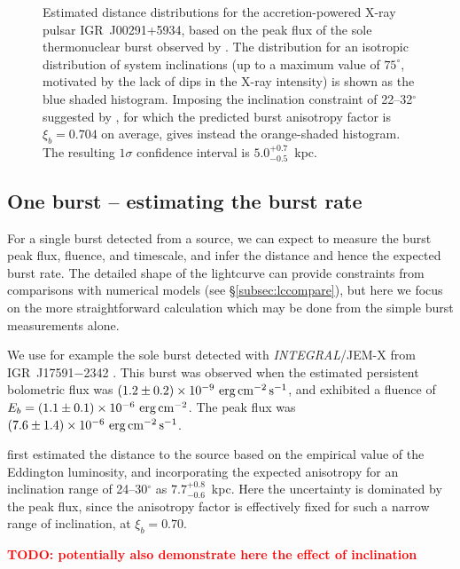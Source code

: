 \documentclass{aastex63}
\newcommand{\epcs}{{\rm erg\,cm^{-2}\,s^{-1}}}
\newcommand{\igr}{{\it INTEGRAL}}
\newcommand{\todo}[1]{\textbf{\textcolor{red}{TODO: #1}}} %
\begin{document}
\begin{figure}[ht!]
\caption{Estimated distance distributions for the accretion-powered X-ray pulsar IGR~J00291+5934, based on the peak flux of the sole thermonuclear burst observed by \cite{defalco17}.
%
The distribution for an isotropic distribution of system inclinations (up to a maximum value of $75^\circ$, motivated by the lack of dips in the X-ray intensity) is shown as the blue shaded histogram. Imposing the inclination constraint of 22--32$^\circ$ suggested by \cite{torres08}, for which the predicted burst anisotropy factor is $\xi_b=0.704$ on average, gives instead the orange-shaded histogram. The resulting $1\sigma$ confidence interval is $5.0_{-0.5}^{+0.7}$~kpc.
\label{fig:dist_igr00291}}
\end{figure}

\subsection{One burst -- estimating the burst rate} 
\label{subsec:1burst}


For a single burst detected from a source, we can expect to measure the burst peak flux, fluence, and timescale, and infer the distance and hence the expected burst rate. The detailed shape of the lightcurve can provide constraints from comparisons with numerical models (see \S\ref{subsec:lccompare}), but here we focus on the more straightforward calculation which may be done from the simple burst measurements alone. 

We use for example the sole burst detected with \igr/JEM-X from IGR~J17591$-$2342 \cite[]{kuiper20}. This burst was observed  when the estimated persistent bolometric flux was $(1.2\pm0.2)\times10^{-9}\ \epcs$, and exhibited a fluence of $E_b =(1.1\pm0.1)\times10^{-6}\ {\rm erg\,cm^{-2}}$. The peak flux was $(7.6\pm1.4)\times10^{-6}\ \epcs$.

\cite{kuiper20} first estimated the distance to the source based on the empirical value of the Eddington luminosity, and incorporating the expected anisotropy for an inclination range of 
24--30$^\circ$ \cite[]{sanna18} as $7.7_{-0.6}^{+0.8}$~kpc. Here the uncertainty is dominated by the peak flux, since the anisotropy factor is effectively fixed for such a narrow range of inclination, at $\xi_b=0.70$.

\todo{potentially also demonstrate here the effect of inclination}
\end{document}
